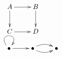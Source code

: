 \documentclass{article}
\begin{document}
$\xymatrix{A \ar[r] \ar[d] & B \ar[d] \\ C \ar[r] & D}$

$\xymatrix{\bullet \ar@(ul,ur) \ar[r] & \bullet \ar@/^/[r] \ar@/_/[r] & \bullet}$
\end{document}
